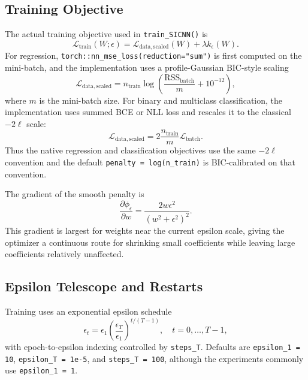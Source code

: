 \documentclass{article}
\begin{document}
\subsection{Training Objective}
The actual training objective used in \texttt{train\_SICNN()} is
\begin{equation}
\mathcal{L}_{\mathrm{train}}(W;\epsilon)
= \mathcal{L}_{\mathrm{data,scaled}}(W) + \lambda k_\epsilon(W).
\end{equation}
For regression, \texttt{torch::nn\_mse\_loss(reduction="sum")} is first computed on the mini-batch, and the implementation uses a profile-Gaussian BIC-style scaling
\begin{equation}
\mathcal{L}_{\mathrm{data,scaled}}
= n_{\mathrm{train}}\log\left(\frac{\mathrm{RSS}_{\mathrm{batch}}}{m}+10^{-12}\right),
\end{equation}
where $m$ is the mini-batch size. For binary and multiclass classification, the implementation uses summed BCE or NLL loss and rescales it to the classical $-2\ell$ scale:
\begin{equation}
\mathcal{L}_{\mathrm{data,scaled}}
= 2\frac{n_{\mathrm{train}}}{m}\mathcal{L}_{\mathrm{batch}}.
\end{equation}
Thus the native regression and classification objectives use the same $-2\ell$ convention and the default \texttt{penalty = log(n\_train)} is BIC-calibrated on that convention.

The gradient of the smooth penalty is
\begin{equation}
\frac{\partial \phi_\epsilon}{\partial w}
= \frac{2w\epsilon^2}{(w^2+\epsilon^2)^2}.
\end{equation}
This gradient is largest for weights near the current epsilon scale, giving the optimizer a continuous route for shrinking small coefficients while leaving large coefficients relatively unaffected.

\subsection{Epsilon Telescope and Restarts}
Training uses an exponential epsilon schedule
\begin{equation}
\epsilon_t=\epsilon_1\left(\frac{\epsilon_T}{\epsilon_1}\right)^{t/(T-1)},
\quad t=0,\ldots,T-1,
\end{equation}
with epoch-to-epsilon indexing controlled by \texttt{steps\_T}. Defaults are \texttt{epsilon\_1 = 10}, \texttt{epsilon\_T = 1e-5}, and \texttt{steps\_T = 100}, although the experiments commonly use \texttt{epsilon\_1 = 1}.
\end{document}
